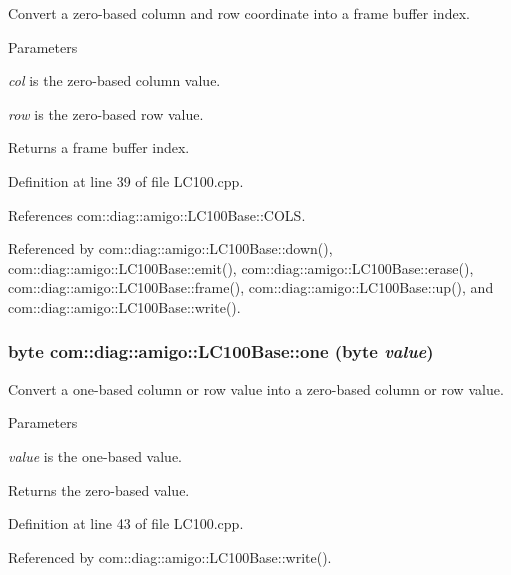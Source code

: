 Convert a zero-\/based column and row coordinate into a frame buffer index. 


\begin{DoxyParams}{Parameters}
\item[{\em col}]is the zero-\/based column value. \item[{\em row}]is the zero-\/based row value. \end{DoxyParams}
\begin{DoxyReturn}{Returns}
a frame buffer index. 
\end{DoxyReturn}


Definition at line 39 of file LC100.cpp.



References com::diag::amigo::LC100Base::COLS.



Referenced by com::diag::amigo::LC100Base::down(), com::diag::amigo::LC100Base::emit(), com::diag::amigo::LC100Base::erase(), com::diag::amigo::LC100Base::frame(), com::diag::amigo::LC100Base::up(), and com::diag::amigo::LC100Base::write().

\hypertarget{classcom_1_1diag_1_1amigo_1_1LC100Base_a8e2489e4637dd50cd06e6432c9b50fac}{
\subsubsection[{one}]{\setlength{\rightskip}{0pt plus 5cm}byte com::diag::amigo::LC100Base::one (byte {\em value})}}
\label{classcom_1_1diag_1_1amigo_1_1LC100Base_a8e2489e4637dd50cd06e6432c9b50fac}


Convert a one-\/based column or row value into a zero-\/based column or row value. 


\begin{DoxyParams}{Parameters}
\item[{\em value}]is the one-\/based value. \end{DoxyParams}
\begin{DoxyReturn}{Returns}
the zero-\/based value. 
\end{DoxyReturn}


Definition at line 43 of file LC100.cpp.



Referenced by com::diag::amigo::LC100Base::write().

